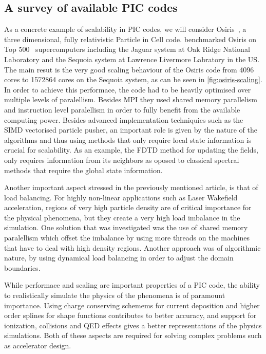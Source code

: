 \documentclass[12pt, class=report, crop=false]{standalone}
\begin{document}
\subsection{A survey of available PIC codes}

As a concrete example of scalability in PIC codes, we will consider
Osiris~\autocite{fonseca_osiristhreedimensional_2002}, a three dimensional,
fully relativistic Particle in Cell code. \Textcite{fonseca_exploitingmultiscale_2013}
benchmarked Osiris on Top 500~\autocite{strohmaier_top500supercomputer_1993}
supercomputers including the Jaguar system at Oak Ridge National Laboratory
and the Sequoia system at Lawrence Livermore Labratory in the US.\@
The main resut is the very good scaling behaviour of the Osiris code from
4096 cores to 1572864 cores on the Sequoia system, as can be seen in \cref{fig:osiris-scaling}.
In order to achieve this performace, the code had to be heavily optimised over
multiple levels of paralellism. Besides MPI they used shared memory parallelism
and instruction level paralellism in order to fully benefit from the available
computing power. Besides advanced implementation techniquies such as the SIMD
vectorised particle pusher, an important role is given by the nature of the algorithms
and thus using methods that only require local state information is crucial for scalability.
As an example, the FDTD method for updating the fields, only requires information
from its neighbors as oposed to classical spectral methods that require the
global state information.

Another important aspect stressed in the previously mentioned article, is that
of load balancing. For highly non-linear applications such as Laser Wakefield
acceleration, regions of very high particle density are of critical importance
for the physical phenomena, but they create a very high load imbalance in the
simulation. One solution that was investigated was the use of shared memory
paralellism which offset the imbalance by using more threads on the machines
that have to deal with high density regions. Another approach was of algorithmic
nature, by using dynamical load balancing in order to adjust the domain boundaries.

While performace and scaling are important properties of a PIC code, the ability
to realistically simulate the physics of the phenomena is of paramount importance.
Using charge conserving schemems for current deposition and higher order splines
for shape functions contributes to better accuracy, and support for ionization,
collisions and QED effects gives a better representations of the physics simulations.
Both of these aspects are required for solving complex problems such as accelerator
design.
\end{document}
